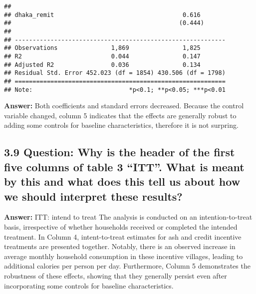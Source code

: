 \documentclass[
]{article}
\begin{document}
\begin{verbatim}
##                                                            
## dhaka_remit                                    0.616       
##                                               (0.444)      
##                                                            
## -----------------------------------------------------------
## Observations               1,869               1,825       
## R2                         0.044               0.147       
## Adjusted R2                0.036               0.134       
## Residual Std. Error 452.023 (df = 1854) 430.506 (df = 1798)
## ===========================================================
## Note:                           *p<0.1; **p<0.05; ***p<0.01
\end{verbatim}

\textbf{Answer:} Both coefficients and standard errors decreased.
Because the control variable changed, column 5 indicates that the
effects are generally robust to adding some controls for baseline
characteristics, therefore it is not surpring.

\clearpage

\hypertarget{question-why-is-the-header-of-the-first-five-columns-of-table-3-itt.-what-is-meant-by-this-and-what-does-this-tell-us-about-how-we-should-interpret-these-results}{%
\subsection{\texorpdfstring{3.9 \textbf{Question: Why is the header of
the first five columns of table 3 ``ITT''. What is meant by this and
what does this tell us about how we should interpret these
results?}}{3.9 Question: Why is the header of the first five columns of table 3 ``ITT''. What is meant by this and what does this tell us about how we should interpret these results?}}\label{question-why-is-the-header-of-the-first-five-columns-of-table-3-itt.-what-is-meant-by-this-and-what-does-this-tell-us-about-how-we-should-interpret-these-results}}

\textbf{Answer:} ITT: intend to treat The analysis is conducted on an
intention-to-treat basis, irrespective of whether households received or
completed the intended treatment. In Column 4, intent-to-treat estimates
for ash and credit incentive treatments are presented together. Notably,
there is an observed increase in average monthly household consumption
in these incentive villages, leading to additional calories per person
per day. Furthermore, Column 5 demonstrates the robustness of these
effects, showing that they generally persist even after incorporating
some controls for baseline characteristics.
\end{document}
